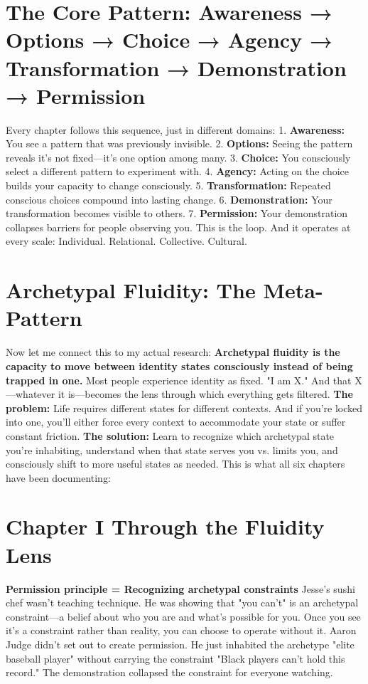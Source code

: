 \section{The Core Pattern: Awareness → Options → Choice → Agency → Transformation → Demonstration → Permission}

Every chapter follows this sequence, just in different domains:
1. \textbf{Awareness:} You see a pattern that was previously invisible.
2. \textbf{Options:} Seeing the pattern reveals it's not fixed—it's one option among many.
3. \textbf{Choice:} You consciously select a different pattern to experiment with.
4. \textbf{Agency:} Acting on the choice builds your capacity to change consciously.
5. \textbf{Transformation:} Repeated conscious choices compound into lasting change.
6. \textbf{Demonstration:} Your transformation becomes visible to others.
7. \textbf{Permission:} Your demonstration collapses barriers for people observing you.
This is the loop. And it operates at every scale:
Individual. Relational. Collective. Cultural.

\section{Archetypal Fluidity: The Meta-Pattern}

Now let me connect this to my actual research:
\textbf{Archetypal fluidity is the capacity to move between identity states consciously instead of being trapped in one.}
Most people experience identity as fixed. "I am X." And that X—whatever it is—becomes the lens through which everything gets filtered.
\textbf{The problem:} Life requires different states for different contexts. And if you're locked into one, you'll either force every context to accommodate your state or suffer constant friction.
\textbf{The solution:} Learn to recognize which archetypal state you're inhabiting, understand when that state serves you vs. limits you, and consciously shift to more useful states as needed.
This is what all six chapters have been documenting:

\section{Chapter I Through the Fluidity Lens}

\textbf{Permission principle = Recognizing archetypal constraints}
Jesse's sushi chef wasn't teaching technique. He was showing that "you can't" is an archetypal constraint—a belief about who you are and what's possible for you.
Once you see it's a constraint rather than reality, you can choose to operate without it.
Aaron Judge didn't set out to create permission. He just inhabited the archetype "elite baseball player" without carrying the constraint "Black players can't hold this record."
The demonstration collapsed the constraint for everyone watching.

